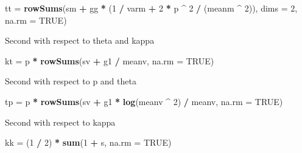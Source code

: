 \documentclass[]{article}
\newenvironment{Shaded}{\begin{snugshade}}{\end{snugshade}}
\newcommand{\DataTypeTok}[1]{\textcolor[rgb]{0.13,0.29,0.53}{#1}}
\newcommand{\DecValTok}[1]{\textcolor[rgb]{0.00,0.00,0.81}{#1}}
\newcommand{\KeywordTok}[1]{\textcolor[rgb]{0.13,0.29,0.53}{\textbf{#1}}}
\newcommand{\NormalTok}[1]{#1}
\newcommand{\OperatorTok}[1]{\textcolor[rgb]{0.81,0.36,0.00}{\textbf{#1}}}
\newcommand{\OtherTok}[1]{\textcolor[rgb]{0.56,0.35,0.01}{#1}}
\newcommand{\StringTok}[1]{\textcolor[rgb]{0.31,0.60,0.02}{#1}}
\begin{document}
\begin{Shaded}
\begin{Highlighting}[]
\NormalTok{tt =}\StringTok{ }\KeywordTok{rowSums}\NormalTok{(sm }\OperatorTok{+}\StringTok{ }\NormalTok{gg }\OperatorTok{*}\StringTok{ }\NormalTok{(}\DecValTok{1} \OperatorTok{/}\StringTok{ }\NormalTok{varm }\OperatorTok{+}\StringTok{ }\DecValTok{2} \OperatorTok{*}\StringTok{ }\NormalTok{p }\OperatorTok{^}\StringTok{ }\DecValTok{2} \OperatorTok{/}\StringTok{ }\NormalTok{(meanm }\OperatorTok{^}\StringTok{ }\DecValTok{2}\NormalTok{)), }\DataTypeTok{dims =} \DecValTok{2}\NormalTok{, }\DataTypeTok{na.rm =} \OtherTok{TRUE}\NormalTok{)}
\end{Highlighting}
\end{Shaded}

Second with respect to theta and kappa

\begin{Shaded}
\begin{Highlighting}[]
\NormalTok{kt =}\StringTok{ }\NormalTok{p }\OperatorTok{*}\StringTok{ }\KeywordTok{rowSums}\NormalTok{(sv }\OperatorTok{+}\StringTok{ }\NormalTok{g1 }\OperatorTok{/}\StringTok{ }\NormalTok{meanv, }\DataTypeTok{na.rm =} \OtherTok{TRUE}\NormalTok{)}
\end{Highlighting}
\end{Shaded}

Second with respect to p and theta

\begin{Shaded}
\begin{Highlighting}[]
\NormalTok{tp =}\StringTok{ }\NormalTok{p }\OperatorTok{*}\StringTok{ }\KeywordTok{rowSums}\NormalTok{(sv }\OperatorTok{+}\StringTok{ }\NormalTok{g1 }\OperatorTok{*}\StringTok{ }\KeywordTok{log}\NormalTok{(meanv }\OperatorTok{^}\StringTok{ }\DecValTok{2}\NormalTok{) }\OperatorTok{/}\StringTok{ }\NormalTok{meanv, }\DataTypeTok{na.rm =} \OtherTok{TRUE}\NormalTok{)}
\end{Highlighting}
\end{Shaded}

Second with respect to kappa

\begin{Shaded}
\begin{Highlighting}[]
\NormalTok{kk =}\StringTok{ }\NormalTok{(}\DecValTok{1} \OperatorTok{/}\StringTok{ }\DecValTok{2}\NormalTok{) }\OperatorTok{*}\StringTok{ }\KeywordTok{sum}\NormalTok{(}\DecValTok{1} \OperatorTok{+}\StringTok{ }\NormalTok{s, }\DataTypeTok{na.rm =} \OtherTok{TRUE}\NormalTok{)}
\end{Highlighting}
\end{Shaded}
\end{document}

